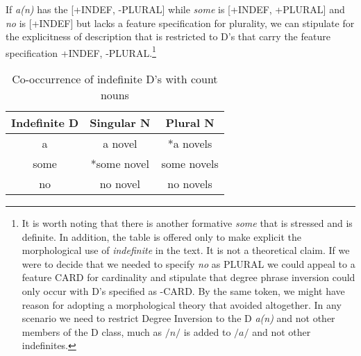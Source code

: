 \documentclass[output=paper,
modfonts
]{LSP/langsci}
\begin{document}
\begin{exe}
\ex \label{ex6}
\begin{xlist}
\end{xlist}


\ex \label{ex7}
\begin{xlist}
\end{xlist}

\end{exe}



If {\textit{a(n)}}  has the  [+INDEF, -PLURAL]  while {\textit{some}} is [+INDEF, +PLURAL] and {\textit{no}} is [+INDEF] but lacks a feature specification for plurality, we can stipulate for the explicitness of description that  is restricted to D's that carry the feature specification +INDEF, -PLURAL.\footnote{It is worth noting that there is another formative {\textit{some}} that is stressed and is definite.  In addition, the table is offered only to make explicit the morphological use of {\textit{indefinite}} in the text.  It is not a theoretical claim.  If we were to decide that we needed to specify {\textit{no}} as PLURAL we could appeal to a feature CARD for cardinality and stipulate that degree phrase inversion could only occur with D's specified as -CARD.  By the same token, we might have reason for adopting a morphological theory that avoided  altogether.  In any scenario we need to restrict Degree Inversion to the D {\textit{a(n)}} and not other members of the D class, much as {\textit{$/n/$}} is added to {\textit{$/a/$}} and not other indefinites.}

\begin{table}[ht]
\centering
\begin{tabular}{| c | c | c |}
\hline
Indefinite D & Singular N  &  Plural N \\
\hline
a & {a novel} & {*a novels}  \\
some & {*some novel}  & {some novels} \\
no & {no novel} & {no novels} \\ 
\hline

\end{tabular}
\caption{Co-occurrence of indefinite D's with count nouns}
\end{table}
\end{document}
